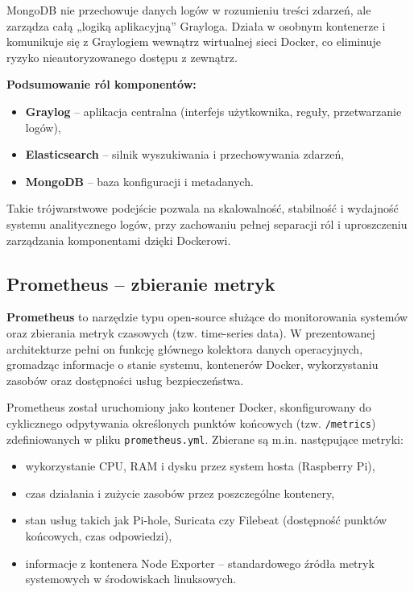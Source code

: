 \documentclass[
    left=2.5cm,         %
    right=2.5cm,        %
    top=2.5cm,          %
    bottom=3cm,         %
    bindingoffset=6mm,  %
    nohyphenation=true %
]{eiti/eiti-thesis} %
\begin{document}
MongoDB nie przechowuje danych logów w rozumieniu treści zdarzeń, ale zarządza całą „logiką aplikacyjną” Grayloga. Działa w osobnym kontenerze i komunikuje się z Graylogiem wewnątrz wirtualnej sieci Docker, co eliminuje ryzyko nieautoryzowanego dostępu z zewnątrz.

\textbf{Podsumowanie ról komponentów:}
\begin{itemize}
    \item \textbf{Graylog} – aplikacja centralna (interfejs użytkownika, reguły, przetwarzanie logów),
    \item \textbf{Elasticsearch} – silnik wyszukiwania i przechowywania zdarzeń,
    \item \textbf{MongoDB} – baza konfiguracji i metadanych.
\end{itemize}

Takie trójwarstwowe podejście pozwala na skalowalność, stabilność i wydajność systemu analitycznego logów, przy zachowaniu pełnej separacji ról i uproszczeniu zarządzania komponentami dzięki Dockerowi.

\subsection{Prometheus – zbieranie metryk}

\textbf{Prometheus} to narzędzie typu open-source służące do monitorowania systemów oraz zbierania metryk czasowych (tzw. time-series data). W prezentowanej architekturze pełni on funkcję głównego kolektora danych operacyjnych, gromadząc informacje o stanie systemu, kontenerów Docker, wykorzystaniu zasobów oraz dostępności usług bezpieczeństwa.

Prometheus został uruchomiony jako kontener Docker, skonfigurowany do cyklicznego odpytywania określonych punktów końcowych (tzw. \texttt{/metrics}) zdefiniowanych w pliku \texttt{prometheus.yml}. Zbierane są m.in. następujące metryki:
\begin{itemize}
    \item wykorzystanie CPU, RAM i dysku przez system hosta (Raspberry Pi),
    \item czas działania i zużycie zasobów przez poszczególne kontenery,
    \item stan usług takich jak Pi-hole, Suricata czy Filebeat (dostępność punktów końcowych, czas odpowiedzi),
    \item informacje z kontenera Node Exporter – standardowego źródła metryk systemowych w środowiskach linuksowych.
\end{itemize}
\end{document}
